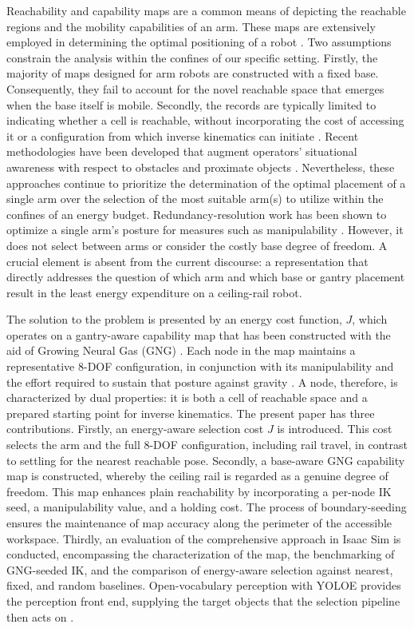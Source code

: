 \documentclass[conference]{IEEEtran}
\begin{document}
Reachability and capability maps are a common means of depicting the reachable 
regions and the mobility capabilities of an arm. These maps are extensively 
employed in determining the optimal positioning of a robot \cite{Zacharias2007,Makhal2018}. 
Two assumptions constrain the analysis within the confines of our specific setting. 
Firstly, the majority of maps designed for arm robots are constructed with a fixed base. 
Consequently, they fail to account for the novel reachable space that emerges when the base 
itself is mobile. Secondly, the records are typically limited to indicating 
whether a cell is reachable, without incorporating the cost of accessing it 
or a configuration from which inverse kinematics can initiate \cite{Zacharias2007}. 
Recent methodologies have been developed that augment operators' situational awareness 
with respect to obstacles and proximate objects
\cite{MoMaPos2024,InvReach2022}. Nevertheless, these approaches continue to 
prioritize the determination of the optimal placement of a single arm over 
the selection of the most suitable arm(s) to utilize within the confines 
of an energy budget.
Redundancy-resolution work has been shown to optimize a single arm's 
posture for measures such as manipulability \cite{Yoshikawa1985}. 
However, it does not select between arms or consider the costly base degree of freedom. 
A crucial element is absent from the current discourse: a representation that 
directly addresses the question of which arm and which base or gantry placement result 
in the least energy expenditure on a ceiling-rail robot.

The solution to the problem is presented by an energy cost function, $J$, 
which operates on a gantry-aware capability map that has been constructed 
with the aid of Growing Neural Gas (GNG) \cite{Fritzke1995}. Each node in 
the map maintains a representative 8-DOF configuration, in conjunction 
with its manipulability and the effort required to sustain that posture against gravity
\cite{Yoshikawa1985}. A node, therefore, is characterized by dual properties: 
it is both a cell of reachable space and a prepared starting point for inverse kinematics. 
The present paper has three contributions. Firstly, an energy-aware selection 
cost $J$ is introduced. This cost selects the arm and the full 8-DOF configuration, 
including rail travel, in contrast to settling for the nearest reachable pose. 
Secondly, a base-aware GNG capability map is constructed, whereby 
the ceiling rail is regarded as a genuine degree of freedom. 
This map enhances plain reachability by incorporating a per-node IK seed, 
a manipulability value, and a holding cost. The process of boundary-seeding 
ensures the maintenance of map accuracy along the perimeter of the accessible workspace. 
Thirdly, an evaluation of the comprehensive approach in Isaac Sim is conducted, 
encompassing the characterization of the map, the benchmarking of GNG-seeded IK, 
and the comparison of energy-aware selection against nearest, fixed, and random baselines. 
Open-vocabulary perception with YOLOE provides the perception front end, supplying the target objects
that the selection pipeline then acts on \cite{Wang2025}.
\end{document}
